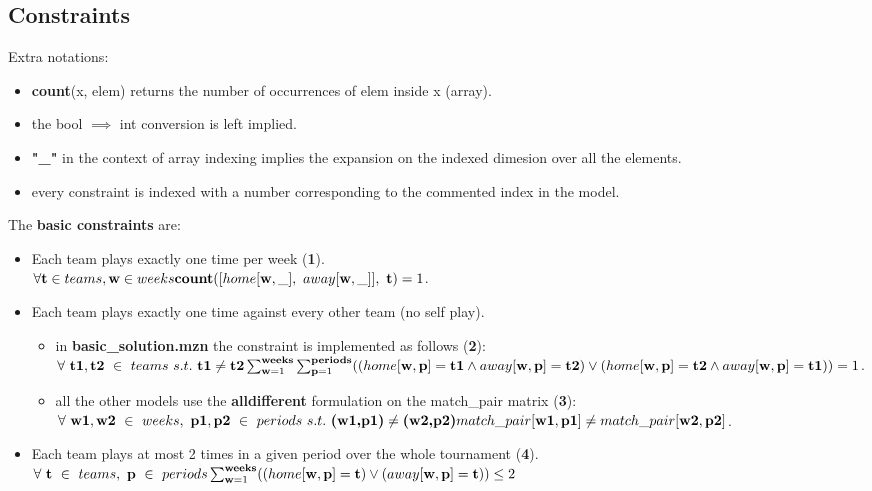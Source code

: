 \documentclass{article}
\begin{document}
\subsection{Constraints}
Extra notations:
\begin{itemize}
    \item \textbf{count}(x, elem) returns the number of occurrences of elem inside x (array).
    \item the bool $\implies$ int conversion is left implied.
    \item \textbf{"\_"} in the context of array indexing implies the expansion on the indexed dimesion over all the elements.
    \item every constraint is indexed with a number corresponding to the commented index in the model.
\end{itemize}
The \textbf{basic constraints} are:
\begin{itemize}

    \item Each team plays exactly one time per week (\textbf{1}).\\
    $\forall \textbf{t} \in teams, \textbf{w} \in weeks\\
    \textbf{count}([home[ \textbf{w}, \_ ], \ away[ \textbf{w}, \_ ]],\ \textbf{t})=1$.
    
    \item Each team plays exactly one time against every other team (no self play).
    \begin{itemize}
        \item in \textbf{basic\_solution.mzn} the constraint is implemented as follows (\textbf{2}):\\
        $\forall\ \textbf{t1}, \textbf{t2}\ \in\ teams\ s.t.\ \textbf{t1} \neq \textbf{t2}\\
        \sum_{\textbf{w}=1}^{\textbf{weeks}}\sum_{\textbf{p}=1}^{\textbf{periods}}((home[ \textbf{w}, \textbf{p} ]=\textbf{t1} \land away[ \textbf{w}, \textbf{p} ]=\textbf{t2}) \lor (home[ \textbf{w}, \textbf{p} ]=\textbf{t2} \land away[ \textbf{w}, \textbf{p} ]=\textbf{t1})) = 1$.
        
        \item all the other models use the \textbf{alldifferent} formulation on the match\_pair matrix (\textbf{3}):
        \\$\forall\ \textbf{w1}, \textbf{w2}\ \in\ weeks,\ \textbf{p1}, \textbf{p2}\ \in\ periods\ s.t.\ \textbf{(w1,p1)} \neq \textbf{(w2,p2)}\\
        match\_pair[ \textbf{w1}, \textbf{p1} ] \neq match\_pair[ \textbf{w2}, \textbf{p2} ]$.
    \end{itemize}

    \item Each team plays at most 2 times in a given period over the whole tournament (\textbf{4}).\\
    $\forall\ \textbf{t}\ \in\ teams,\ \textbf{p}\ \in\ periods\\
    \sum_{\textbf{w}=1}^{\textbf{weeks}}((home[\textbf{w}, \textbf{p}] = \textbf{t})\lor (away[\textbf{w}, \textbf{p}] = \textbf{t})) \leq 2$
\end{itemize}
\end{document}
